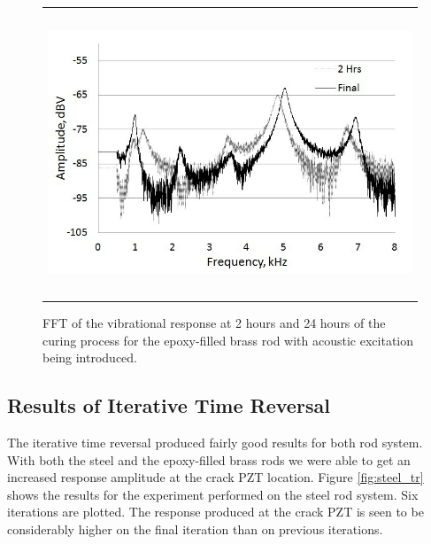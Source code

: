 \documentclass[a4paper]{spie}  %
\begin{document}
\begin{figure}[h!]
\begin{center}
\begin{tabular}{c}
\includegraphics[height=8.5cm]{fft2}
\end{tabular}
\end{center}
\caption[example] 
{ \label{fig:fft2} 
   FFT of the vibrational response at 2 hours and 24 hours of the curing process for the epoxy-filled brass rod with acoustic excitation being introduced.}	
\end{figure}

\subsection{Results of Iterative Time Reversal}
The iterative time reversal produced fairly good results for both rod system. With both the steel and the epoxy-filled brass rods we were able to get an increased response amplitude at the crack PZT location. Figure \ref{fig:steel_tr} shows the results for the experiment performed on the steel rod system. Six iterations are plotted. The response produced at the crack PZT is seen to be considerably higher on the final iteration than on previous iterations.
\end{document}
